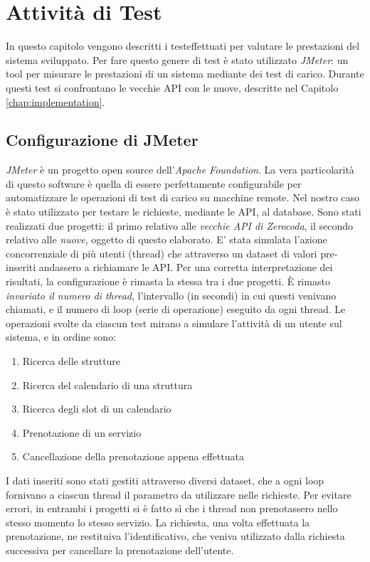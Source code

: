 \chapter{Attività di Test}
\label{chap:testing}
In questo capitolo vengono descritti i testeffettuati per valutare le prestazioni del sistema sviluppato. Per fare questo genere di test è stato utilizzato \emph{JMeter}: un tool per misurare le prestazioni di un sistema mediante dei test di carico. Durante questi test si confrontano le vecchie API con le nuove, descritte nel Capitolo \ref{chap:implementation}.

\section{Configurazione di JMeter}
\emph{JMeter} è un progetto open source dell'\emph{Apache Foundation}. La vera particolarità di questo software è quella di essere perfettamente configurabile per automatizzare le operazioni di test di carico su macchine remote. Nel nostro caso è stato utilizzato per testare le richieste, mediante le API, al database. Sono stati realizzati due progetti: il primo relativo alle \textit{vecchie API di Zerocoda}, il secondo relativo alle \textit{nuove}, oggetto di questo elaborato. E' stata simulata l'azione concorrenziale di più utenti (thread) che attraverso un dataset di valori pre-inseriti andassero a richiamare le API. Per una corretta interpretazione dei risultati, la configurazione è rimasta la stessa tra i due progetti. È rimasto \textit{invariato il numero di thread}, l'intervallo (in secondi) in cui questi venivano chiamati, e il numero di loop (serie di operazione) eseguito da ogni thread. Le operazioni svolte da ciascun test mirano a simulare l'attività di un utente sul sistema, e in ordine sono:
\begin{enumerate}
    \item Ricerca delle strutture
    \item Ricerca del calendario di una struttura
    \item Ricerca degli slot di un calendario
    \item Prenotazione di un servizio
    \item Cancellazione della prenotazione appena effettuata
\end{enumerate}
I dati inseriti sono stati gestiti attraverso diversi dataset, che a ogni loop fornivano a ciascun thread il parametro da utilizzare nelle richieste. Per evitare errori, in entrambi i progetti si è fatto sì che i thread non prenotassero nello stesso momento lo stesso servizio. La richiesta, una volta effettuata la prenotazione, ne restituiva l'identificativo, che veniva utilizzato dalla richiesta successiva per cancellare la prenotazione dell'utente.

